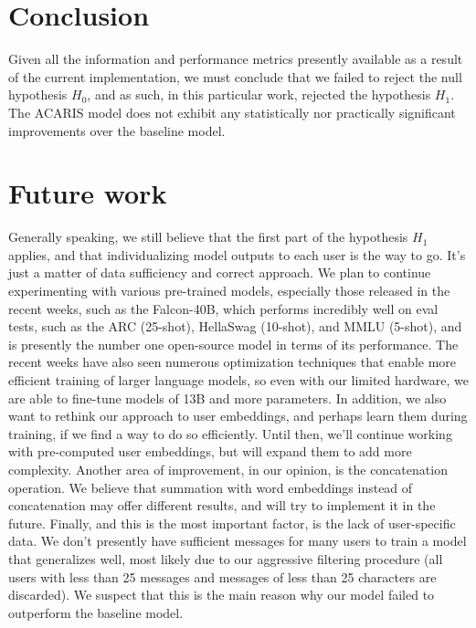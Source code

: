 \documentclass{article}
\begin{document}
\section{Conclusion}
Given all the information and performance metrics presently available as a result of the current implementation, we must conclude that we failed to reject the null hypothesis $H_0$, and as such, in this particular work, rejected the hypothesis $H_1$. The ACARIS model does not exhibit any statistically nor practically significant improvements over the baseline model.

\section{Future work}
Generally speaking, we still believe that the first part of the hypothesis $H_1$ applies, and that individualizing model outputs to each user is the way to go. It's just a matter of data sufficiency and correct approach. We plan to continue experimenting with various pre-trained models, especially those released in the recent weeks, such as the Falcon-40B\cite{falcon40b}, which performs incredibly well on eval tests, such as the ARC (25-shot)\cite{clark2018think}, HellaSwag (10-shot)\cite{zellers2019hellaswag}, and MMLU (5-shot)\cite{hendrycks2021measuring}, and is presently the number one open-source model\cite{open-llm-leaderboard} in terms of its performance. The recent weeks have also seen numerous optimization techniques that enable more efficient training of larger language models, so even with our limited hardware, we are able to fine-tune models of 13B and more parameters. In addition, we also want to rethink our approach to user embeddings, and perhaps learn them during training, if we find a way to do so efficiently. Until then, we'll continue working with pre-computed user embeddings, but will expand them to add more complexity. Another area of improvement, in our opinion, is the concatenation operation. We believe that summation with word embeddings instead of concatenation may offer different results, and will try to implement it in the future. Finally, and this is the most important factor, is the lack of user-specific data. We don't presently have sufficient messages for many users to train a model that generalizes well, most likely due to our aggressive filtering procedure (all users with less than 25 messages and messages of less than 25 characters are discarded). We suspect that this is the main reason why our model failed to outperform the baseline model.
\newpage

\printbibliography
\end{document}
